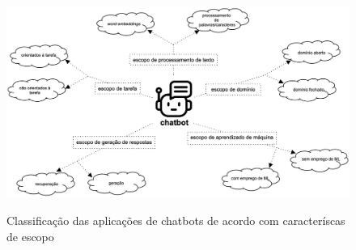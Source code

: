 \begin{figure}[htb!]
    \centering    
    \caption{Classificação das aplicações de chatbots de acordo com caracteríscas de escopo}
    \includegraphics[width=1\linewidth]{estrutura/img/classificacao_chatbots.png}
    \label{fig:M2}
\end{figure}

